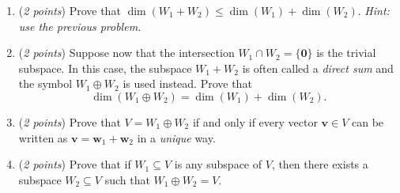 \documentclass[11pt]{article}
\theoremstyle{definition}
\numberwithin{equation}{subsection}
\begin{document}
\begin{enumerate}
\begin{enumerate}

\item[(a)] (\emph{2 points}) Prove that $\dim(W_1+W_2)\leq \dim(W_1)+\dim(W_2)$. {\it Hint: use the previous problem.}

\item[(b)] (\emph{2 points}) Suppose now that the intersection $W_1\cap W_2=\{\mathbf{0}\}$ is the trivial subspace. In this case, the subspace $W_1+W_2$ is often called a \emph{direct sum} and the symbol $W_1\oplus W_2$ is used instead. Prove that
$$\dim(W_1\oplus W_2)=\dim(W_1)+\dim(W_2).$$

\item[(c)] (\emph{2 points}) Prove that $V=W_1\oplus W_2$ if and only if every vector $\mathbf{v}\in V$ can be written as $\mathbf{v}=\mathbf{w}_1+\mathbf{w}_2$ in a \emph{unique} way. 

\item[(d)] (\emph{2 points}) Prove that if $W_1\subseteq V$ is any subspace of $V$, then there exists a subspace $W_2\subseteq V$ such that $W_1\oplus W_2=V$. 

\end{enumerate}
\fi

\end{enumerate}
\end{document}
